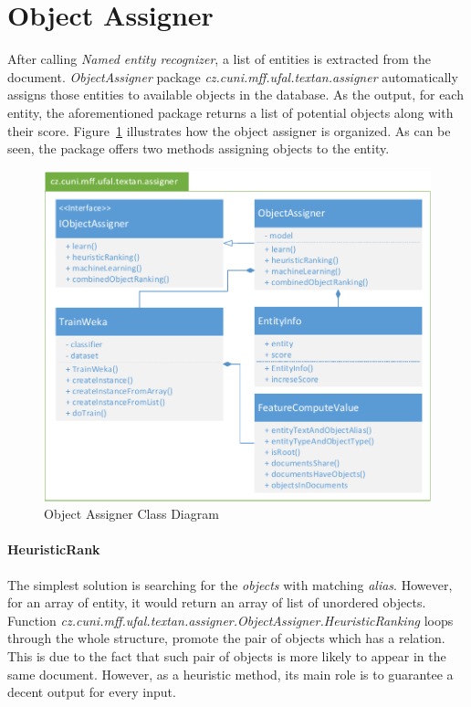 \section{Object Assigner}
\label{sec:ObjectAssigner}

After calling \emph{Named entity recognizer}, a list of entities is extracted
from the document. \emph{ObjectAssigner} package \emph{cz.\-cuni.\-mff.\-ufal.\-textan.\-assigner}
automatically assigns those entities to
available objects in the database. As the output, for each entity, the
aforementioned package returns a list of potential objects along
with their score. Figure~\ref{fig:objectassigner} illustrates 
how the object assigner is organized. As can be seen, the package offers 
two methods assigning objects to the entity.

\begin{figure}[!htb]
        \centering
        \includegraphics[width=\textwidth]{Images/ObjectAssignerClass}
        \caption{Object Assigner Class Diagram}
        \label{fig:objectassigner}
\end{figure}


\paragraph{HeuristicRank}
The simplest solution is searching for the \textit{objects} with matching 
\textit{alias}. However, for an array of entity, it would return an array of 
list of unordered objects. Function
\emph{cz.\-cuni.\-mff.\-ufal.\-textan.\-assigner.\-ObjectAssigner.\-HeuristicRanking}
loops through the whole structure, promote the pair of objects which has a
relation. This is due to the fact that such pair of objects is more likely to
appear in the same document. However, as a heuristic method, its main role is to
guarantee a decent output for every input.

